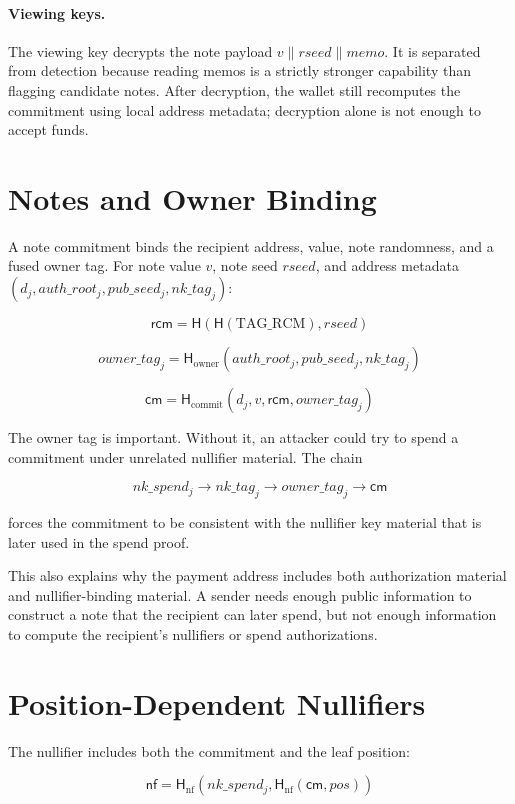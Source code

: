 \documentclass[11pt]{article}
\newcommand{\Hash}{\mathsf{H}}
\newcommand{\cm}{\mathsf{cm}}
\newcommand{\nf}{\mathsf{nf}}
\newcommand{\rcm}{\mathsf{rcm}}
\begin{document}
\paragraph{Viewing keys.}
The viewing key decrypts the note payload \(v \parallel rseed \parallel memo\).
It is separated from detection because reading memos is a strictly stronger
capability than flagging candidate notes. After decryption, the wallet still
recomputes the commitment using local address metadata; decryption alone is not
enough to accept funds.

\section{Notes and Owner Binding}

A note commitment binds the recipient address, value, note randomness, and a
fused owner tag. For note value \(v\), note seed \(rseed\), and address
metadata \((d_j, auth\_root_j, pub\_seed_j, nk\_tag_j)\):

\[
  \rcm = \Hash(\Hash(\mathrm{TAG\_RCM}), rseed)
\]

\[
  owner\_tag_j =
  \Hash_{\mathrm{owner}}(auth\_root_j, pub\_seed_j, nk\_tag_j)
\]

\[
  \cm =
  \Hash_{\mathrm{commit}}(d_j, v, \rcm, owner\_tag_j)
\]

The owner tag is important. Without it, an attacker could try to spend a
commitment under unrelated nullifier material. The chain

\[
nk\_spend_j \rightarrow nk\_tag_j \rightarrow owner\_tag_j \rightarrow \cm
\]

forces the commitment to be consistent with the nullifier key material that is
later used in the spend proof.

This also explains why the payment address includes both authorization material
and nullifier-binding material. A sender needs enough public information to
construct a note that the recipient can later spend, but not enough information
to compute the recipient's nullifiers or spend authorizations.

\section{Position-Dependent Nullifiers}

The nullifier includes both the commitment and the leaf position:

\[
  \nf =
  \Hash_{\mathrm{nf}}(nk\_spend_j,
    \Hash_{\mathrm{nf}}(\cm, pos))
\]
\end{document}
